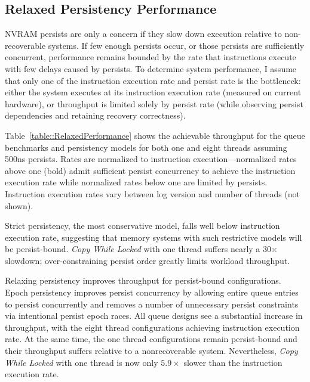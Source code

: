 \subsection{Relaxed Persistency Performance}
\label{section:Evaluation:PersistencyPerformance}

NVRAM persists are only a concern if they slow down execution relative to non-recoverable systems.
If few enough persists occur, or those persists are sufficiently concurrent, performance remains bounded by the rate that instructions execute with few delays caused by persists.
To determine system performance, I assume that only one of the instruction execution rate and persist rate is the bottleneck: either the system executes at its instruction execution rate (measured on current hardware), or throughput is limited solely by persist rate (while observing persist dependencies and retaining recovery correctness).



Table~\ref{table::RelaxedPerformance} shows the achievable throughput for the queue benchmarks and persistency models for both one and eight threads assuming 500ns persists.
Rates are normalized to instruction execution---normalized rates above one (bold) admit sufficient persist concurrency to achieve the instruction execution rate while normalized rates below one are limited by persists.
Instruction execution rates vary between log version and number of threads (not shown).

Strict persistency, the most conservative model, falls well below instruction execution rate, suggesting that memory systems with such restrictive models will be persist-bound.
\emph{Copy While Locked} with one thread suffers nearly a 30$\times$ slowdown; over-constraining persist order greatly limits workload throughput.

Relaxing persistency improves throughput for persist-bound configurations.
Epoch persistency improves persist concurrency by allowing entire queue entries to persist concurrently and removes a number of unnecessary persist constraints via intentional persist epoch races.
All queue designs see a substantial increase in throughput, with the eight thread configurations achieving instruction execution rate.
At the same time, the one thread configurations remain persist-bound and their throughput suffers relative to a nonrecoverable system.
Nevertheless, \emph{Copy While Locked} with one thread is now only $5.9\times$ slower than the instruction execution rate.

